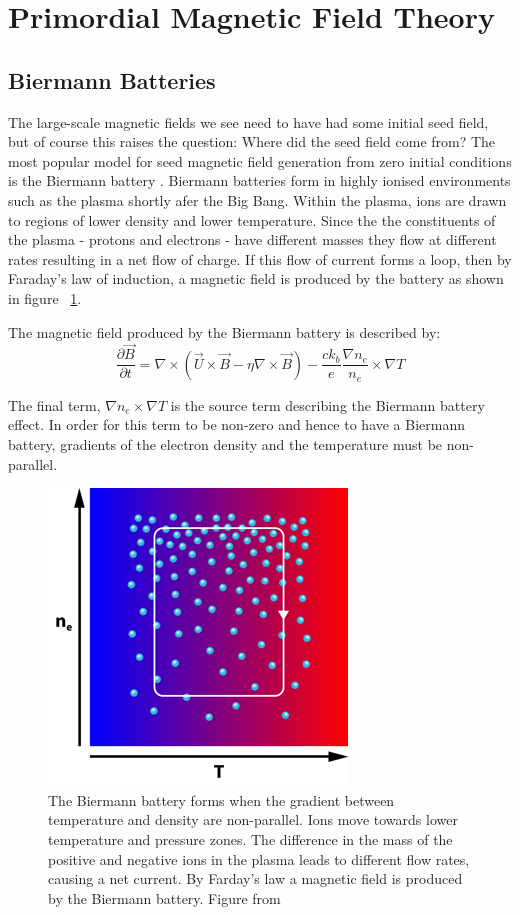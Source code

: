 \section{Primordial Magnetic Field Theory}

\subsection{Biermann Batteries}

The large-scale magnetic fields we see need to have had some initial seed field, but of course this raises the question: Where did the seed field come from? The most popular model for seed magnetic field generation from zero initial conditions is the Biermann battery \cite{Subramanian:2008tt}. Biermann batteries form in highly ionised environments such as the plasma shortly afer the Big Bang. Within the plasma, ions are drawn to regions of lower density and lower temperature. Since the the constituents of the plasma - protons and electrons - have different masses they flow at different rates resulting in a net flow of charge. If this flow of current forms a loop, then by Faraday's law of induction, a magnetic field is produced by the battery as shown in figure ~\ref{biermann}.

The magnetic field produced by the Biermann battery is described by:
\begin{equation}
\label{eqn:biermann}
\frac{\partial \vec{B}}{\partial t} = \nabla\times(\vec{U}\times\vec{B}-\eta\nabla \times\vec{B}) - \frac{c k_{b}}{e}\frac{\nabla n_e}{n_e} \times \nabla T
\end{equation}

The final term, $\nabla n_e \times \nabla T$ is the source term describing the Biermann battery effect. In order for this term to be non-zero and hence to have a Biermann battery, gradients of the electron density and the temperature must be non-parallel.

\begin{figure}[h]
\label{biermann}
\centering
\includegraphics[scale=0.7]{images/biermann.png} 
\caption{The Biermann battery forms when the gradient between temperature and density are non-parallel. Ions move towards lower temperature and pressure zones. The difference in the mass of the positive and negative ions in the plasma leads to different flow rates, causing a net current. By Farday's law a magnetic field is produced by the Biermann battery. Figure from \cite{Biermann}}
\end{figure}

